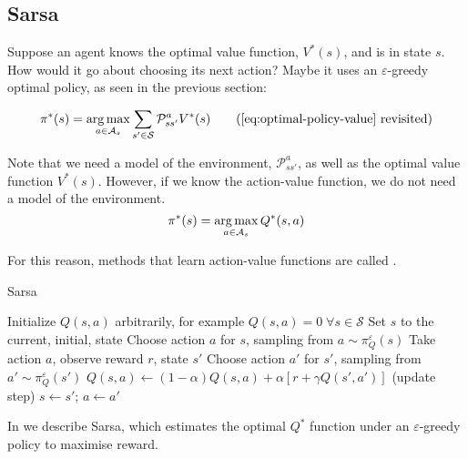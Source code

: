 \citep[Section~2.2]{sutton1998introduction}

\subsection{Sarsa\label{subsec:sarsa}}

Suppose an agent knows the optimal value function, $V^*(s)$, and is in state $s$.
How would it go about choosing its next action? Maybe it uses an
$\varepsilon$-greedy optimal policy, as seen in the previous section:

\begin{equation}
  \pi^*(s) = \argmax_{a\in\mathcal{A}_s} \sum_{s'\in\mathcal{S}}\mathcal{P}^a_{ss'}V^*(s)
  \tag{\ref{eq:optimal-policy-value} revisited}
\end{equation}

Note that we need a model of the environment, $\mathcal{P}^a_{ss'}$, as well as
the optimal value function $V^*(s)$. However, if we know the action-value
function, we do not need a model of the environment.
\begin{equation}
  \pi^*(s) = \argmax_{a\in\mathcal{A}_s} Q^*(s, a)
  \label{eq:q-policy}
\end{equation}

For this reason, methods that learn action-value functions are called
 \citep[Subsection~21.3.2]{russell2009aima}.

\begin{algorithm}[h]
\caption{Sarsa \citep[Section~6.4]{sutton1998introduction}}
\label{alg:sarsa}
\begin{algorithmic}
\State Initialize $Q(s, a)$ arbitrarily, for example $Q(s, a)=0 \; \forall
s\in\mathcal{S}$
  \State Set $s$ to the current, initial, state
  \State Choose action $a$ for $s$, sampling from $a \sim \pi^\varepsilon_Q(s)$
    \State Take action $a$, observe reward $r$, state $s'$
    \State Choose action $a'$ for $s'$, sampling from $a' \sim \pi^\varepsilon_Q(s')$
    \State $Q(s, a) \gets (1-\alpha)Q(s,a) +
      \alpha \left[r + \gamma Q(s', a') \right]$ (update step)
    \State $s \gets s'$; $a \gets a'$
\EndRepeatComment
\end{algorithmic}
\end{algorithm}

In  we describe Sarsa, which estimates the
optimal $Q^*$ function under an $\varepsilon$-greedy policy to maximise reward.

